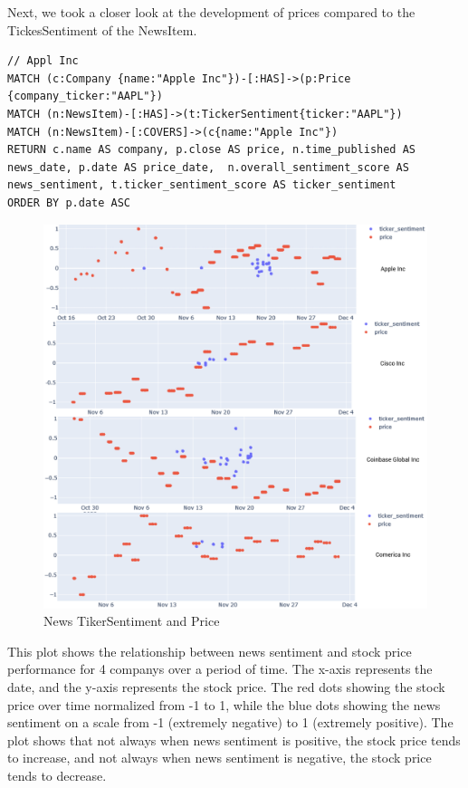 Next, we took a closer look at the development of prices compared to the TickesSentiment of the NewsItem.
\begin{lstlisting}[caption={Relationship of NewsItem TikerSantiment and Price of Apple Stock }, label={lst:newsItems_tikerSantiment_and_price_apple},captionpos=b]
// Appl Inc
MATCH (c:Company {name:"Apple Inc"})-[:HAS]->(p:Price {company_ticker:"AAPL"})
MATCH (n:NewsItem)-[:HAS]->(t:TickerSentiment{ticker:"AAPL"})
MATCH (n:NewsItem)-[:COVERS]->(c{name:"Apple Inc"})
RETURN c.name AS company, p.close AS price, n.time_published AS news_date, p.date AS price_date,  n.overall_sentiment_score AS news_sentiment, t.ticker_sentiment_score AS ticker_sentiment
ORDER BY p.date ASC
\end{lstlisting}

\begin{figure}[h]
 \centering
 \includegraphics[width=1.0\textwidth]{images/price_news_ticker_charts.png}
 \caption{News TikerSentiment and Price}
 \label{fig:price_news_sentiment}
\end{figure}

This plot shows the relationship between news sentiment and stock price performance for 4 companys over a period of time. The x-axis represents the date, and the y-axis represents the stock price. The red dots showing the stock price over time normalized from -1 to 1, while the blue dots showing the news sentiment on a scale from -1 (extremely negative) to 1 (extremely positive). The plot shows that not always when news sentiment is positive, the stock price tends to increase, and  not always when news sentiment is negative, the stock price tends to decrease.


